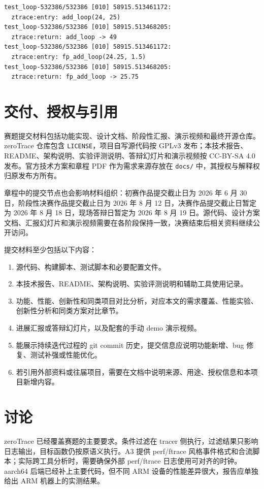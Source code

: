 \documentclass[UTF8,a4paper,11pt,fontset=fandol]{ctexart}
\newcommand{\code}[1]{\texttt{#1}}
\begin{document}
\begin{lstlisting}
test_loop-532386/532386 [010] 58915.513461172:
  ztrace:entry: add_loop(24, 25)
test_loop-532386/532386 [010] 58915.513468205:
  ztrace:return: add_loop -> 49
test_loop-532386/532386 [010] 58915.513461172:
  ztrace:entry: fp_add_loop(24.25, 1.5)
test_loop-532386/532386 [010] 58915.513468205:
  ztrace:return: fp_add_loop -> 25.75
\end{lstlisting}

\section{交付、授权与引用}

赛题提交材料包括功能实现、设计文档、阶段性汇报、演示视频和最终开源仓库。zeroTrace 仓库包含 \code{LICENSE}，项目自写源代码按 GPLv3 发布；本技术报告、README、架构说明、实验评测说明、答辩幻灯片和演示视频按 CC-BY-SA 4.0 发布。官方技术方案和章程 PDF 作为需求来源存放在 \code{docs/} 中，其授权与解释权归原发布方所有。

章程中的提交节点也会影响材料组织：初赛作品提交截止日为 2026 年 6 月 30 日，阶段性决赛作品提交截止日为 2026 年 8 月 12 日，决赛作品提交截止日暂定为 2026 年 8 月 18 日，现场答辩日暂定为 2026 年 8 月 19 日。源代码、设计方案文档、汇报幻灯片和演示视频需要在各阶段保持一致，决赛结束后相关资料继续公开访问。

提交材料至少包括以下内容：

\begin{enumerate}[leftmargin=2.4em]
  \item 源代码、构建脚本、测试脚本和必要配置文件。
  \item 本技术报告、README、架构说明、实验评测说明和辅助工具使用记录。
  \item 功能、性能、创新性和同类项目对比分析，对应本文的需求覆盖、性能实验、创新性分析和同类方案对比章节。
  \item 进展汇报或答辩幻灯片，以及配套的手动 demo 演示视频。
  \item 能展示持续迭代过程的 git commit 历史，提交信息应说明功能新增、bug 修复、测试补强或性能优化。
  \item 若引用外部资料或往届项目，需要在文档中说明来源、用途、授权信息和本项目新增内容。
\end{enumerate}

\section{讨论}

zeroTrace 已经覆盖赛题的主要要求。条件过滤在 tracer 侧执行，过滤结果只影响日志输出，目标函数仍按原语义执行。A3 提供 perf/ftrace 风格事件格式和合流脚本；实际跨工具分析时，需要确保外部 perf/ftrace 日志使用可对齐的时钟。aarch64 后端已经补上主要代码，但不同 ARM 设备的性能差异很大，报告应单独给出 ARM 机器上的实测结果。
\end{document}
